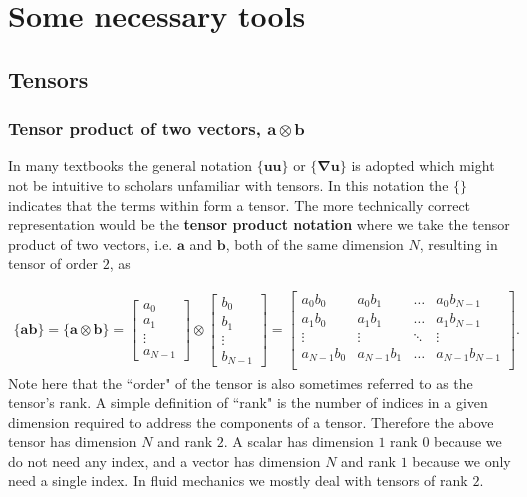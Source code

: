 \documentclass[11pt,letterpaper,titlepage]{article}
\newcommand{\beqn}{\begin{equation}
	\begin{aligned}}
\newcommand{\eeqn}{\end{aligned}
	\end{equation}}
\newcommand{\bnabla}{\boldsymbol{\nabla}}
\newcommand{\bvel}{\mathbf{u}}
\numberwithin{equation}{section}
\begin{document}
\newpage 
\section{Some necessary tools}

\subsection{Tensors}
\subsubsection{Tensor product of two vectors, $\mathbf{a}\otimes \mathbf{b}$}
In many textbooks the general notation $\{\bvel \bvel\}$ or $\{ \bnabla \bvel \}$ is adopted which might not be intuitive to scholars unfamiliar with tensors. In this notation the $\{\}$ indicates that the terms within form a tensor. The more technically correct representation would be the \textbf{tensor product notation} where we take the tensor product of two vectors, i.e. $\mathbf{a}$ and $\mathbf{b}$, both of the same dimension $N$, resulting in tensor of order $2$, as

\beqn 
\{\mathbf{a} \mathbf{b} \} = 
\{\mathbf{a} \otimes \mathbf{b} \}
=
\begin{bmatrix}
a_0 \\ a_1 \\ \vdots \\ a_{N-1}
\end{bmatrix}
\otimes 
\begin{bmatrix}
b_0 \\ b_1 \\ \vdots \\ b_{N-1}
\end{bmatrix}
=
\begin{bmatrix}
a_0 b_0 & a_0 b_1 & \hdots & a_0 b_{N-1} \\
a_1 b_0 & a_1 b_1 & \hdots & a_1 b_{N-1} \\
\vdots   & \vdots   & \ddots & \vdots \\
a_{N-1} b_0 & a_{N-1} b_1 & \hdots & a_{N-1} b_{N-1} \\
\end{bmatrix}.
\eeqn 
\newline 
Note here that the ``order" of the tensor is also sometimes referred to as the tensor's rank. A simple definition of ``rank" is the number of indices in a given dimension required to address the components of a tensor. Therefore the above tensor has dimension $N$ and rank $2$. A scalar has dimension $1$ rank $0$ because we do not need any index, and a vector has dimension $N$ and rank $1$ because we only need a single index. In fluid mechanics we mostly deal with tensors of rank $2$.
\end{document}

